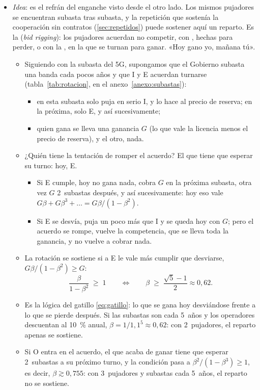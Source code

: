 \documentclass[11pt]{article}
\begin{document}
\begin{itemize}
\item \emph{Idea}: es el refrán del enganche visto desde el otro lado. Los mismos pujadores se encuentran subasta tras subasta, y la repetición que sostenía la cooperación sin contratos (\ref{sec:repetidos}) puede sostener aquí un reparto. Es la  (\emph{bid rigging}): los pujadores acuerdan no competir, con , hechas para perder, o con la , en la que se turnan para ganar\nocite{Asker2010Study}. «Hoy gano yo, mañana tú».
  \begin{itemize}
  \item Siguiendo con la subasta del 5G, supongamos que el Gobierno subasta una banda cada pocos años y que \textup{I} y E acuerdan turnarse (tabla~\ref{tab:rotacion}, en el anexo~\ref{anexo:subastas}):
    \begin{itemize}
    \item en esta subasta solo puja en serio \textup{I}, y lo hace al precio de reserva; en la próxima, solo E, y así sucesivamente;
    \item quien gana se lleva una ganancia $G$ (lo que vale la licencia menos el precio de reserva), y el otro, nada.
    \end{itemize}
  \item ¿Quién tiene la tentación de romper el acuerdo? El que tiene que esperar su turno: hoy, E.
    \begin{itemize}
    \item Si E cumple, hoy no gana nada, cobra $G$ en la próxima subasta, otra vez $G$ 2~subastas después, y así sucesivamente: hoy eso vale $G\beta+G\beta^3+\dots=G\beta/(1-\beta^2)$.
    \item Si E se desvía, puja un poco más que \textup{I} y se queda hoy con $G$; pero el acuerdo se rompe, vuelve la competencia, que se lleva toda la ganancia, y no vuelve a cobrar nada.
    \end{itemize}
  \item La rotación se sostiene si a E le vale más cumplir que desviarse, $G\beta/(1-\beta^2)\geq G$:
\begin{equation}\label{eq:rotacion}
\frac{\beta}{1-\beta^{2}}\;\geq\;1\qquad\Longleftrightarrow\qquad\beta\;\geq\;\frac{\sqrt{5}-1}{2}\approx0{,}62.
\end{equation}
  \item Es la lógica del gatillo \eqref{eq:gatillo}: lo que se gana hoy desviándose frente a lo que se pierde después. Si las subastas son cada 5~años y los operadores descuentan al 10~\% anual, $\beta=1/1{,}1^5\approx0{,}62$: con 2~pujadores, el reparto apenas se sostiene.
  \item Si O entra en el acuerdo, el que acaba de ganar tiene que esperar 2~subastas a su próximo turno, y la condición pasa a $\beta^2/(1-\beta^3)\geq1$, es decir, $\beta\gtrsim0{,}755$: con 3~pujadores y subastas cada 5~años, el reparto no se sostiene.
  \end{itemize}
\end{itemize}
\end{document}
